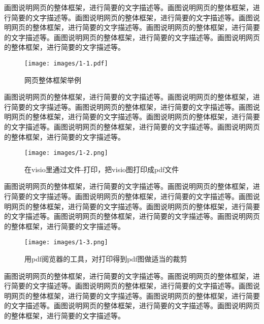 \documentclass[supercite]{Experimental_Report}
\theoremstyle{definition}
\begin{document}
画图说明网页的整体框架，进行简要的文字描述等。画图说明网页的整体框架，进行简要的文字描述等。画图说明网页的整体框架，进行简要的文字描述等。画图说明网页的整体框架，进行简要的文字描述等。画图说明网页的整体框架，进行简要的文字描述等。画图说明网页的整体框架，进行简要的文字描述等。画图说明网页的整体框架，进行简要的文字描述等。

\begin{figure}[htb] %
	\begin{center}
		\texttt{[image: images/1-1.pdf]}
		\caption{网页整体框架举例}
		\label{fig1-1}
	\end{center}
\end{figure}

画图说明网页的整体框架，进行简要的文字描述等。画图说明网页的整体框架，进行简要的文字描述等。画图说明网页的整体框架，进行简要的文字描述等。画图说明网页的整体框架，进行简要的文字描述等。画图说明网页的整体框架，进行简要的文字描述等。画图说明网页的整体框架，进行简要的文字描述等。画图说明网页的整体框架，进行简要的文字描述等。

\begin{figure}[htb]
	\begin{center}
		\texttt{[image: images/1-2.png]}
		\caption{在visio里通过文件-打印，把visio图打印成pdf文件}
		\label{fig1-2}
	\end{center}
\end{figure}

画图说明网页的整体框架，进行简要的文字描述等。画图说明网页的整体框架，进行简要的文字描述等。画图说明网页的整体框架，进行简要的文字描述等。画图说明网页的整体框架，进行简要的文字描述等。画图说明网页的整体框架，进行简要的文字描述等。画图说明网页的整体框架，进行简要的文字描述等。画图说明网页的整体框架，进行简要的文字描述等。

\begin{figure}[htb]
	\begin{center}
		\texttt{[image: images/1-3.png]}
		\caption{用pdf阅览器的工具，对打印得到pdf图做适当的裁剪}
		\label{fig1-3}
	\end{center}
\end{figure}

画图说明网页的整体框架，进行简要的文字描述等。画图说明网页的整体框架，进行简要的文字描述等。画图说明网页的整体框架，进行简要的文字描述等。画图说明网页的整体框架，进行简要的文字描述等。画图说明网页的整体框架，进行简要的文字描述等。画图说明网页的整体框架，进行简要的文字描述等。画图说明网页的整体框架，进行简要的文字描述等。
\end{document}
